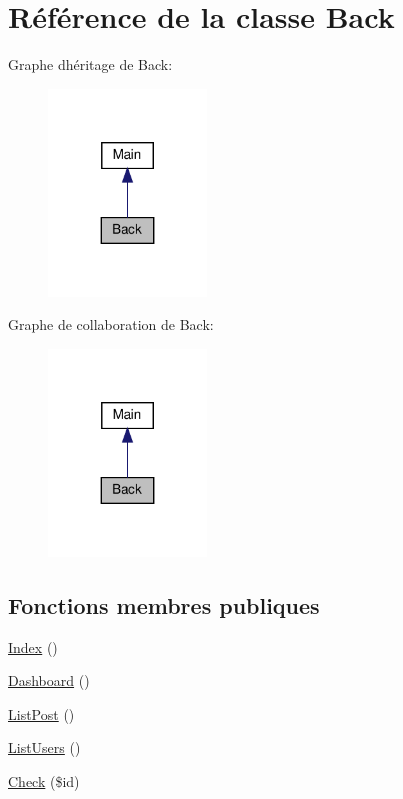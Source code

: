 \hypertarget{class_src_1_1_controllers_1_1_back}{}\section{Référence de la classe Back}
\label{class_src_1_1_controllers_1_1_back}


Graphe d\textquotesingle{}héritage de Back\+:\nopagebreak
\begin{figure}[H]
\begin{center}
\leavevmode
\includegraphics[width=119pt]{d2/d0f/class_src_1_1_controllers_1_1_back__inherit__graph}
\end{center}
\end{figure}


Graphe de collaboration de Back\+:\nopagebreak
\begin{figure}[H]
\begin{center}
\leavevmode
\includegraphics[width=119pt]{dd/db5/class_src_1_1_controllers_1_1_back__coll__graph}
\end{center}
\end{figure}
\subsection*{Fonctions membres publiques}
\begin{DoxyCompactItemize}
\item 
\hyperlink{class_src_1_1_controllers_1_1_back_ac36db983080e1b0934908febca5de2d9}{Index} ()
\item 
\hyperlink{class_src_1_1_controllers_1_1_back_a405a66825259e2e811a2011a61c2beff}{Dashboard} ()
\item 
\hyperlink{class_src_1_1_controllers_1_1_back_a8ce0a92892ab19020f1ebefe99d88a00}{List\+Post} ()
\item 
\hyperlink{class_src_1_1_controllers_1_1_back_abfd4f6736a8cd4dc4fa1e012996f4a23}{List\+Users} ()
\item 
\hyperlink{class_src_1_1_controllers_1_1_back_a384a1ec9e22b88a73de48023bb2bbf4f}{Check} (\$id)
\end{DoxyCompactItemize}
